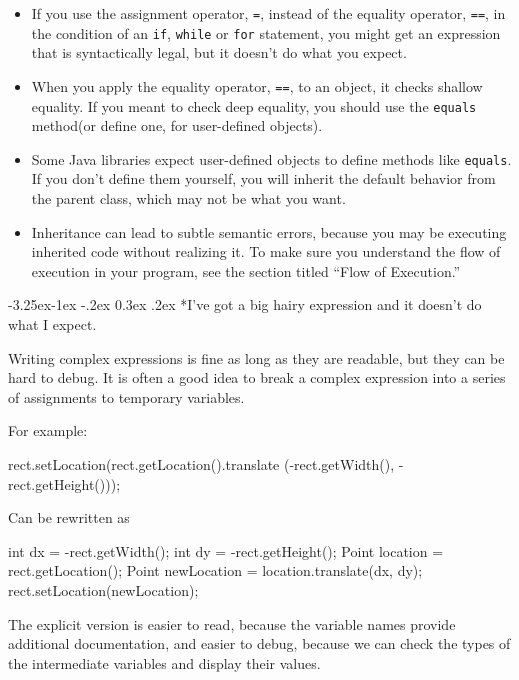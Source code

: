 \documentclass{book}
\makeatletter
\renewcommand\subsection{\@startsection {subsection}{2}{0mm}%
    {-3.25ex\@plus -1ex \@minus -.2ex}%
    {0.3ex \@plus .2ex}%
    {\normalfont\large\bfseries}}
\makeatother
\begin{document}
\begin{itemize}

\item If you use the assignment operator,
{\tt =}, instead of the equality operator, {\tt ==}, in the
condition of an {\tt if}, {\tt while} or {\tt for} statement,
you might get an expression that is syntactically legal, but
it doesn't do what you expect.

\item When you apply the equality operator, {\tt ==}, to an
object, it checks shallow equality.  If you meant to check
deep equality, you should use the {\tt equals} method(or
define one, for user-defined objects).

\item Some Java libraries expect user-defined objects to
define methods like {\tt equals}.  If you don't define them
yourself, you will inherit the default behavior from the parent
class, which may not be what you want.

\item Inheritance can lead to subtle semantic errors,
because you may be executing inherited code without realizing it.
To make sure you understand the flow of execution in your
program, see the section titled ``Flow of Execution.''

\end{itemize}


\subsection*{I've got a big hairy expression and it doesn't
do what I expect.}

Writing complex expressions is fine as long as they are readable,
but they can be hard to debug.  It is often a good idea to
break a complex expression into a series of assignments to
temporary variables.

For example:

\begin{verbatimtab}
rect.setLocation(rect.getLocation().translate
                    (-rect.getWidth(), -rect.getHeight()));
\end{verbatimtab}
%
Can be rewritten as

\begin{verbatimtab}
int dx = -rect.getWidth();
int dy = -rect.getHeight();
Point location = rect.getLocation();
Point newLocation = location.translate(dx, dy);
rect.setLocation(newLocation);
\end{verbatimtab}
%
The explicit version is easier to read, because the variable
names provide additional documentation, and easier to debug,
because we can check the types of the intermediate variables
and display their values.
\end{document}
